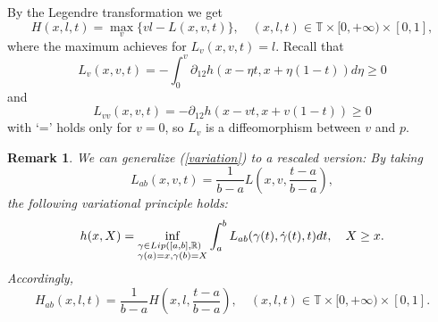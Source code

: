 \documentclass{amsart}
\newtheorem{rmk}[thm]{Remark}
\begin{document}
By the Legendre transformation we get 
\[
H(x,l,t)=\max_v\{vl-L(x,v,t)\},\quad (x,l,t)\in{\mathbb{T}}\times[0,+\infty)\times[0,1],
\]
where the maximum achieves for $L_v(x,v,t)=l$. Recall that 
\begin{equation}\label{momentum1}
L_v(x,v,t)=-\int_0^v\partial_{12}h(x-\eta t,x+\eta(1-t))d\eta\geq0
\end{equation}
and
\[
L_{vv}(x,v,t)=-\partial_{12}h(x-v t,x+v(1-t))\geq0
\]
with `=' holds only for $v=0$, so $L_v$ is a diffeomorphism between $v$ and $p$.
\begin{rmk}
We can generalize (\ref{variation}) to a rescaled version: By taking
\begin{equation}\label{rescale}
L_{ab}(x,v,t)=\frac{1}{b-a}L(x,v,\frac{t-a}{b-a}),
\end{equation}
the following variational principle holds:
\begin{equation}
h(x,X)=\inf_{\begin{subarray}{1}
\gamma\in Lip([a,b],{\mathbb{R}})\\\gamma(a)=x,\gamma(b)=X
\end{subarray}
}\int_a^bL_{ab}(\gamma(t),\dot\gamma(t),t)dt, \quad X\geq x.
\end{equation}
Accordingly, 
\[
H_{ab}(x,l,t)=\frac{1}{b-a}H(x,l,\frac{t-a}{b-a}),\quad (x,l,t)\in{\mathbb{T}}\times[0,+\infty)\times[0,1].
\]
\end{rmk}
\end{document}
